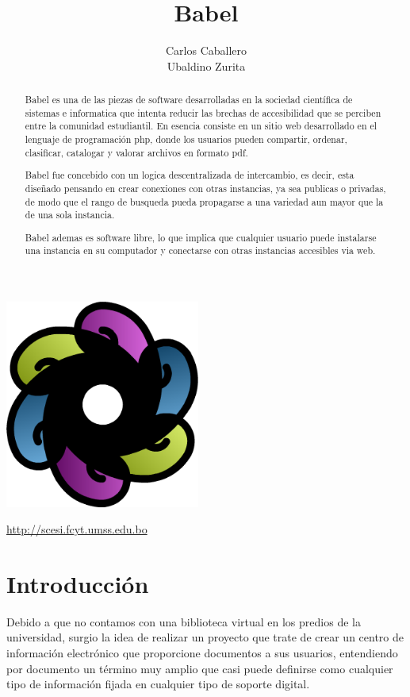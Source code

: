 \documentclass[letter,12pt]{article}
\title{\bf Babel}
\author{Carlos Caballero\\Ubaldino Zurita}
\begin{document}
\maketitle
\begin{center}\includegraphics[width=0.48\textwidth]{img/babel.png}\end{center}
\begin{center}\url {http://scesi.fcyt.umss.edu.bo}\end{center}
\pagebreak

\tableofcontents
\pagebreak

\begin{abstract}
Babel es una de las piezas de software desarrolladas en la sociedad científica de sistemas
e informatica que intenta reducir las brechas de accesibilidad que se perciben entre la
comunidad estudiantil. En esencia consiste en un sitio web desarrollado en el lenguaje de
programación php, donde los usuarios pueden compartir, ordenar, clasificar, catalogar y
valorar archivos en formato pdf.

Babel fue concebido con un logica descentralizada de intercambio, es decir, esta diseñado
pensando en crear conexiones con otras instancias, ya sea publicas o privadas, de modo que
el rango de busqueda pueda propagarse a una variedad aun mayor que la de una sola instancia.

Babel ademas es software libre, lo que implica que cualquier usuario puede instalarse una
instancia en su computador y conectarse con otras instancias accesibles via web.
\end{abstract}
\pagebreak

\section{Introducción}
Debido a que no contamos con una biblioteca virtual en los predios de la universidad,
surgio la idea de realizar un proyecto que trate de crear un centro de información
electrónico que proporcione documentos a sus usuarios, entendiendo por documento un término
muy amplio que casi puede definirse como cualquier tipo de información fijada en cualquier
tipo de soporte digital.
\end{document}
